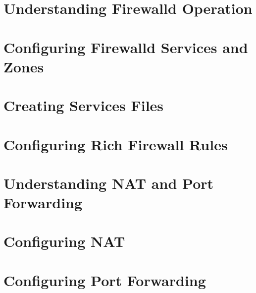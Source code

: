 
\usepackage{minted}
\usepackage{booktabs}


	
	
	\section{Understanding Firewalld Operation}
	
	
	\section{Configuring Firewalld Services and Zones}
	\section{Creating Services Files}
	\section{Configuring Rich Firewall Rules}
	\section{Understanding NAT and Port Forwarding}
	\section{Configuring NAT}
	\section{Configuring Port Forwarding}
	



